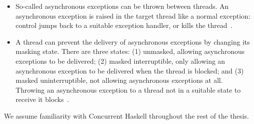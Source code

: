 \begin{itemize}
\item So-called asynchronous exceptions can be thrown between threads.
  An asynchronous exception is raised in the target thread like a
  normal exception: control jumps back to a suitable exception
  handler, or kills the thread~.

\item A thread can prevent the delivery of asynchronous exceptions by
  changing its masking state.  There are three states: (1) unmasked,
  allowing asynchronous exceptions to be delivered; (2) masked
  interruptible, only allowing an asynchronous exception to be
  delivered when the thread is blocked; and (3) masked
  uninterruptible, not allowing asynchronous exceptions at all.
  Throwing an asynchronous exception to a thread not in a suitable
  state to receive it blocks~.
\end{itemize}

We assume familiarity with Concurrent Haskell throughout the rest of
the thesis.
